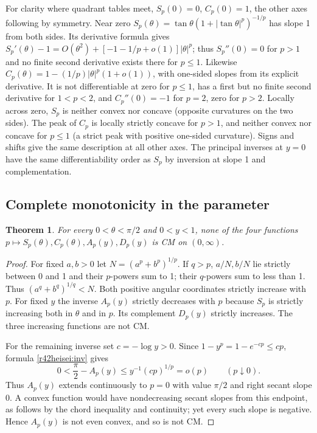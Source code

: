 \documentclass[11pt,a4paper]{article}
\numberwithin{equation}{section}
\newtheorem{theorem}{Theorem}[section]
\theoremstyle{definition}
\theoremstyle{remark}
\begin{document}
For clarity where quadrant tables meet, $S_p(0)=0$, $C_p(0)=1$, the other axes following by symmetry. Near zero $S_p(\theta)=\tan\theta(1+|\tan\theta|^p)^{-1/p}$ has slope 1 from both sides. Its derivative formula gives $S_p'(\theta)-1=O(\theta^2)+[-1-1/p+o(1)]|\theta|^p$; thus $S_p''(0)=0$ for $p>1$ and no finite second derivative exists there for $p\le1$. Likewise $C_p(\theta)=1-(1/p)|\theta|^p(1+o(1))$, with one-sided slopes from its explicit derivative. It is not differentiable at zero for $p\le1$, has a first but no finite second derivative for $1<p<2$, and $C_p''(0)=-1$ for $p=2$, zero for $p>2$. Locally across zero, $S_p$ is neither convex nor concave (opposite curvatures on the two sides). The peak of $C_p$ is locally strictly concave for $p>1$, and neither convex nor concave for $p\le1$ (a strict peak with positive one-sided curvature). Signs and shifts give the same description at all other axes. The principal inverses at $y=0$ have the same differentiability order as $S_p$ by inversion at slope 1 and complementation.

\subsection{Complete monotonicity in the parameter}
\begin{theorem}
For every $0<\theta<\pi/2$ and $0<y<1$, none of the four functions $p\mapsto S_p(\theta), C_p(\theta), A_p(y), D_p(y)$ is CM on $(0,\infty)$.
\end{theorem}
\begin{proof}
For fixed $a,b>0$ let $N=(a^p+b^p)^{1/p}$. If $q>p$, $a/N,b/N$ lie strictly between 0 and 1 and their $p$-powers sum to 1; their $q$-powers sum to less than 1. Thus $(a^q+b^q)^{1/q}<N$. Both positive angular coordinates strictly increase with $p$. For fixed $y$ the inverse $A_p(y)$ strictly decreases with $p$ because $S_p$ is strictly increasing both in $\theta$ and in $p$. Its complement $D_p(y)$ strictly increases. The three increasing functions are not CM.

For the remaining inverse set $c=-\log y>0$. Since $1-y^p=1-e^{-cp}\le cp$, formula \eqref{r42heisei:inv} gives
\[
 0<\frac\pi2-A_p(y)\le y^{-1}(cp)^{1/p}=o(p)\qquad(p\downarrow0).
\]
Thus $A_p(y)$ extends continuously to $p=0$ with value $\pi/2$ and right secant slope 0. A convex function would have nondecreasing secant slopes from this endpoint, as follows by the chord inequality and continuity; yet every such slope is negative. Hence $A_p(y)$ is not even convex, and so is not CM.
\end{proof}
\end{document}
